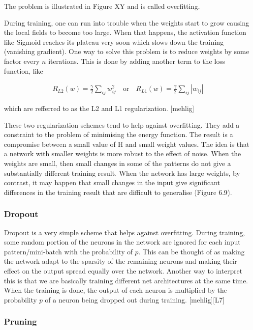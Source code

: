 The problem is illustrated in Figure XY and is called overfitting. 

During training, one can run into trouble when the weights start to grow causing the local fields to become too large. When that happens, the activation function like Sigmoid reaches its plateau very soon which slows down the training (vanishing gradient). One way to solve this problem is to reduce weights by some factor every $ n $ iterations. This is done by adding another term to the loss function, like

\begin{gather}
	R_{L2}(w) = \frac{\gamma}{2} \sum\limits_{ij} w_{ij}^{2} \quad \text{or} \quad R_{L1}(w) = \frac{\gamma}{2} \sum\limits_{ij} |w_{ij}|
\end{gather}

\noindent which are refferred to as the L2 and L1 regularization. [mehlig]

These two regularization schemes tend to help against overfitting. They add a constraint to the problem of minimising the energy function. The result is a compromise between a small value of H and small weight values. The idea is that a network with smaller weights is more robust to the effect of noise. When the weights are small, then small changes in some of the
patterns do not give a substantially different training result. When the network has large weights, by contrast, it may happen that small changes in the input give significant differences in the training result that are difficult to generalise (Figure 6.9).

\subsubsection{Dropout}

Dropout is a very simple scheme that helps against overfitting. During training, some random portion of the neurons in the network are ignored for each input pattern/mini-batch with the probability of $ p $. This can be thought of as making the network adapt to the sparsity of the remaining neurons and making their effect on the output spread equally over the network. Another way to interpret this is that we are basically training different net architectures at the same time. When the training is done, the output of each neuron is multiplied by the probability $ p $ of a neuron being dropped out during training. [mehlig][L7]

\subsubsection{Pruning}

